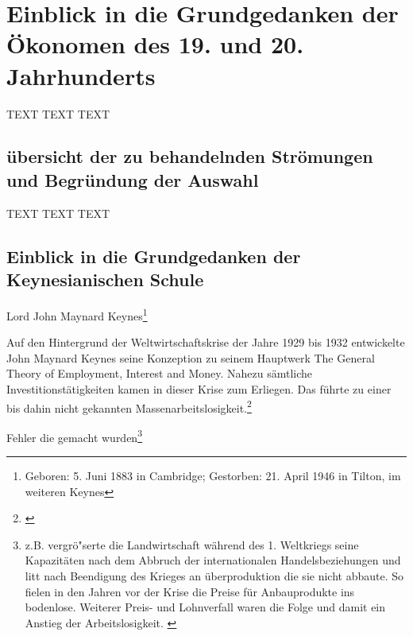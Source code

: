 \documentclass[
        onecolumn,
        a4paper,
        abstracton,
        parskip=half
        ,final
        ]{scrartcl}
\begin{document}
\clearpage





\section{Einblick in die Grundgedanken der {\"O}konomen des 19. und 20. Jahrhunderts}
  \label{sec3:stroemungen}
  TEXT TEXT TEXT


\subsection{{\"u}bersicht der zu behandelnden Str{\"o}mungen und Begr{\"u}ndung der Auswahl} %

TEXT TEXT TEXT




\subsection{Einblick in die Grundgedanken der Keynesianischen Schule} %

Lord John Maynard Keynes\footnote[14]{Geboren: 5. Juni 1883 in Cambridge; Gestorben: 21. April 1946 in Tilton, im weiteren Keynes}

Auf den Hintergrund der Weltwirtschaftskrise der Jahre 1929 bis 1932 entwickelte John Maynard Keynes seine Konzeption zu seinem Hauptwerk \frqq The General Theory of Employment, Interest and Money\flqq. Nahezu s{\"a}mtliche Investitionst{\"a}tigkeiten kamen in dieser Krise zum Erliegen. Das f{\"u}hrte zu einer bis dahin nicht gekannten Massenarbeitslosigkeit.\footnote[601]{\citep*[S.203]{peters2000}}

Fehler die gemacht wurden\footnote[602]{z.B. vergr{\"o}{"s}erte die Landwirtschaft w{\"a}hrend des 1. Weltkriegs seine Kapazit{\"a}ten nach dem Abbruch der internationalen Handelsbeziehungen und litt nach Beendigung des Krieges an {\"u}berproduktion die sie nicht abbaute. So fielen in den Jahren vor der Krise die Preise f{\"u}r Anbauprodukte ins bodenlose. Weiterer Preis- und Lohnverfall waren die Folge und damit ein Anstieg der Arbeitslosigkeit. \citep*[vgl.][S.14ff]{bombach1981theorie}}
\end{document}
